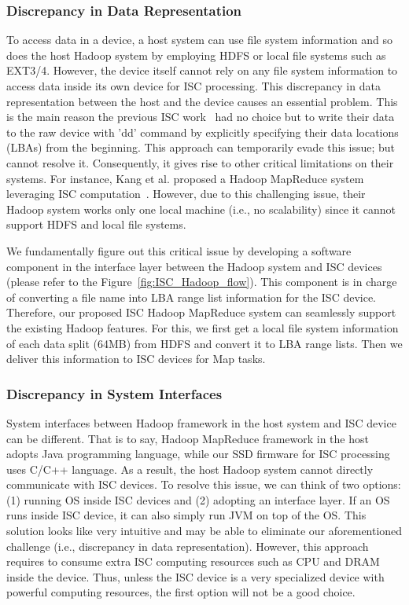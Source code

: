 \subsubsection{Discrepancy in Data Representation}\label{subsubsec:data_represent}
To access data in a device, a host system can use file system information and so does the host Hadoop system by employing HDFS or local file systems such as EXT3/4. However, the device itself cannot rely on any file system information to access data inside its own device for ISC processing. This discrepancy in data representation between the host and the device causes an essential problem. This is the main reason the previous ISC work~\cite{SmartSSD:SIGMOD:2013,SmartSSDHadoop:MSST:2013} had no choice but to write their data to the raw device with 'dd' command by explicitly specifying their data locations (LBAs) from the beginning. This approach can temporarily evade this issue; but cannot resolve it. Consequently, it gives rise to other critical limitations on their systems. For instance, Kang et al. proposed a Hadoop MapReduce system leveraging ISC computation~\cite{SmartSSDHadoop:MSST:2013}. However, due to this challenging issue, their Hadoop system works only one local machine (i.e., no scalability) since it cannot support HDFS and local file systems. 
  
We fundamentally figure out this critical issue by developing a software component in the interface layer between the Hadoop system and ISC devices (please refer to the Figure~\ref{fig:ISC_Hadoop_flow}). This component is in charge of converting a file name into LBA range list information for the ISC device. Therefore, our proposed ISC Hadoop MapReduce system can seamlessly support the existing Hadoop features. For this, we first get a local file system information of each data split (64MB) from HDFS and convert it to LBA range lists. Then we deliver this information to ISC devices for Map tasks.


\subsubsection{Discrepancy in System Interfaces}\label{subsubsec:system_interface}
System interfaces between Hadoop framework in the host system and ISC device can be different. That is to say, Hadoop MapReduce framework in the host adopts Java programming language, while our SSD firmware for ISC processing uses C/C++ language. As a result, the host Hadoop system cannot directly communicate with ISC devices. To resolve this issue, we can think of two options: (1) running OS inside ISC devices and (2) adopting an interface layer. If an OS runs inside ISC device, it can also simply run JVM on top of the OS. This solution looks like very intuitive and may be able to eliminate our aforementioned challenge (i.e., discrepancy in data representation). However, this approach requires to consume extra ISC computing resources such as CPU and DRAM inside the device. Thus, unless the ISC device is a very specialized device with powerful computing resources, the first option will not be a good choice. 

